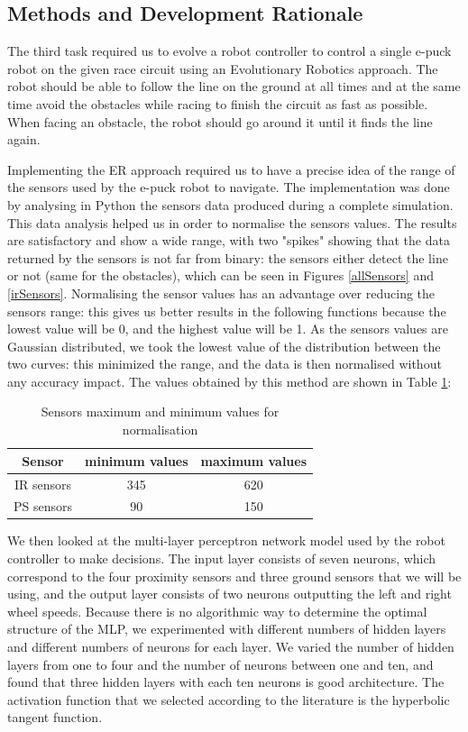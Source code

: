 \documentclass[lettersize,journal]{IEEEtran}
\begin{document}
\subsection{Methods and Development Rationale}
The third task required us to evolve a robot controller to control a single e-puck robot on the given race circuit using an Evolutionary Robotics approach. The robot should be able to follow the line on the ground at all times and at the same time avoid the obstacles while racing to finish the circuit as fast as possible. When facing an obstacle, the robot should go around it until it finds the line again.
\par
Implementing the ER approach required us to have a precise idea of the range of the sensors used by the e-puck robot to navigate. The implementation was done by analysing in Python the sensors data produced during a complete simulation. This data analysis helped us in order to normalise the sensors values. The results are satisfactory and show a wide range, with two "spikes" showing that the data returned by the sensors is not far from binary: the sensors either detect the line or not (same for the obstacles), which can be seen in Figures \ref{allSensors} and \ref{irSensors}. Normalising the sensor values has an advantage over reducing the sensors range: this gives us better results in the following functions because the lowest value will be 0, and the highest value will be 1. As the sensors values are Gaussian distributed, we took the lowest value of the distribution between the two curves: this minimized the range, and the data is then normalised without any accuracy impact.
The values obtained by this method are shown in Table \ref{tab1}:

\begin{table}[H]
\begin{center}
\caption{Sensors maximum and minimum values for normalisation}
\label{tab1}
\begin{tabular}{| c | c | c |}
\hline
 Sensor & minimum values & maximum values\\[.1em]
\hline
IR sensors & 345 & 620\\[.1em]
\hline
PS sensors & 90 & 150\\[.1em]
\hline 
\end{tabular}
\end{center}
\end{table}

\par
We then looked at the multi-layer perceptron network model used by the robot controller to make decisions. The input layer consists of seven neurons, which correspond to the four proximity sensors and three ground sensors that we will be using, and the output layer consists of two neurons outputting the left and right wheel speeds. Because there is no algorithmic way to determine the optimal structure of the MLP, we experimented with different numbers of hidden layers and different numbers of neurons for each layer. We varied the number of hidden layers from one to four and the number of neurons between one and ten, and found that three hidden layers with each ten neurons is good architecture. The activation function that we selected according to the literature is the hyperbolic tangent function.
\end{document}
